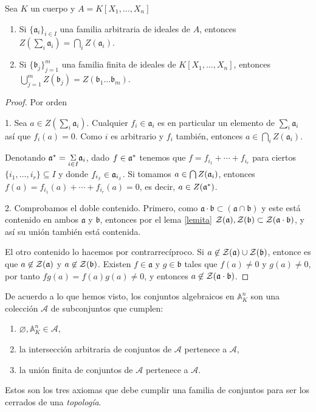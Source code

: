 \documentclass[./main.tex]{subfiles}
\begin{document}
	\begin{proposition}
		Sea $K$ un cuerpo y $A = K[X_1,\dots , X_n]$
		\begin{enumerate}
			\item Si $\{\mathfrak a_i\}_{i\in I}$ una familia arbitraria de ideales de $A$, entonces $Z(\sum_i \mathfrak a_i) = \bigcap_i Z(\mathfrak a_i)$.
			\item Si $\{\mathfrak b_j\}_{j = 1}^m$ una familia finita de ideales de $K[X_1,\dots , X_n]$, entonces $\bigcup_{j=1}^m Z(\mathfrak b_j) = Z(\mathfrak b_1 \dots \mathfrak b_m)$.
		\end{enumerate}
	\end{proposition}
	\begin{proof}
		Por orden

		1. Sea $a\in Z(\sum_i \mathfrak a_i)$. Cualquier $f_i \in \mathfrak a_i$ es en particular un elemento de $\sum_i \mathfrak a_i$ así que $f_i(a)  = 0$. Como $i$ es arbitrario y $f_i$ también, entonces $a \in \bigcap_i Z(\mathfrak a_i)$.

		Denotando $\mathfrak{a}^*=\underset{i\in I}{\Sigma}\mathfrak{a}_i$, dado $f\in\mathfrak{a}^*$ tenemos que $f=f_{i_1}+\cdots+f_{i_r}$ para ciertos $\{i_1,\dots,i_r\}\subseteq I$ y donde $f_{i_j}\in\mathfrak{a}_{i_j}$. Si tomamos $a\in\bigcap Z(\mathfrak{a}_i)$, entonces $f(a)=f_{i_1}(a)+\cdots+f_{i_r}(a)=0$, es decir, $a\in Z(\mathfrak{a}^*)$.



		2. Comprobamos el doble contenido. Primero, como $\mathfrak a \cdot \mathfrak b \subset ( \mathfrak a \cap \mathfrak b )$ y este está contenido en ambos $\mathfrak a$ y $\mathfrak b$, entonces por el lema \ref{lemita} $\mathcal{Z}(\mathfrak a), \mathcal{Z}(\mathfrak b)\subset \mathcal{Z}(\mathfrak a \cdot \mathfrak b) $, y así su unión también está contenida.

		El otro contenido lo hacemos por contrarrecíproco.  Si $a\not\in \mathcal{Z}(\mathfrak a)\cup \mathcal{Z}(\mathfrak b)$, entonce es que $a\not\in \mathcal{Z}( \mathfrak a)$ y $a\not\in \mathcal{Z}( \mathfrak b)$. Existen $f\in \mathfrak a$ y $g\in \mathfrak b$ tales que $f(a)\neq 0$ y $g(a) \neq 0$, por tanto $fg(a) = f(a)g(a) \neq 0$, y entonces $a\not\in \mathcal{Z}(\mathfrak a\cdot \mathfrak b)$.

	\end{proof}

	De acuerdo a lo que hemos visto, los conjuntos algebraicos en $\mathbb A^n_K$ son una colección $\mathcal A$ de subconjuntos que cumplen:
	\begin{enumerate}
		\item $\varnothing, \mathbb A^n_K \in \mathcal A$,
		\item la intersección arbitraria de conjuntos de $\mathcal A$ pertenece a $\mathcal A$,
		\item la unión finita de conjuntos de $\mathcal A$ pertenece a $\mathcal A$.
	\end{enumerate}
	Estos son los tres axiomas que debe cumplir una familia de conjuntos para ser los cerrados de una \emph{topología}.
\end{document}
